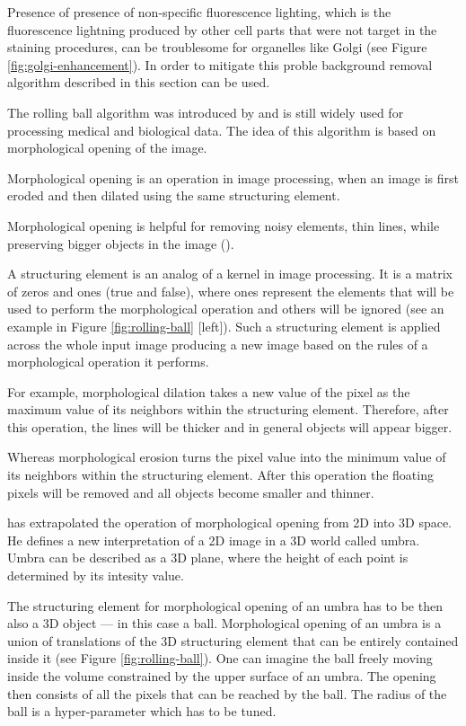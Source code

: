 Presence of presence of non-specific fluorescence lighting, which is the fluorescence lightning produced by other cell parts that were not target in the staining procedures, can be troublesome for organelles like Golgi (see Figure \ref{fig:golgi-enhancement}). In order to mitigate this proble background removal algorithm described in this section can be used.

The rolling ball algorithm was introduced by \cite{Sternberg_1983} and is still widely used for processing medical and biological data. The idea of this algorithm is based on morphological opening of the image. 

\begin{definition}
	\label{def:morphological-opening}
	Morphological opening is an operation in image processing, when an image is first eroded and then dilated using the same structuring element. 
\end{definition}

Morphological opening is helpful for removing noisy elements, thin lines, while preserving bigger objects in the image (\cite{morph_open}).

A structuring element is an analog of a kernel in image processing. It is a matrix of zeros and ones (true and false), where ones represent the elements that will be used to perform the morphological operation and others will be ignored (see an example in Figure \ref{fig:rolling-ball} [left]). Such a structuring element is applied across the whole input image producing a new image based on the rules of a morphological operation it performs.  

For example, morphological dilation takes a new value of the pixel as the maximum value of its neighbors within the structuring element. Therefore, after this operation, the lines will be thicker and in general objects will appear bigger.

Whereas morphological erosion turns the pixel value into the minimum value of its neighbors within the structuring element. After this operation the floating pixels will be removed and all objects become smaller and thinner.

\cite{Sternberg_1983} has extrapolated the operation of morphological opening from 2D into 3D space. He defines a new interpretation of a 2D image in a 3D world called umbra. Umbra can be described as a 3D plane, where the height of each point is determined by its intesity value.

The structuring element for morphological opening of an umbra has to be then also a 3D object --- in this case a ball. Morphological opening of an umbra is a union of translations of the 3D structuring element that can be entirely contained inside it (see Figure \ref{fig:rolling-ball}). One can imagine the ball freely moving inside the volume constrained by the upper surface of an umbra. The opening then consists of all the pixels that can be reached by the ball. The radius of the ball is a hyper-parameter which has to be tuned.

